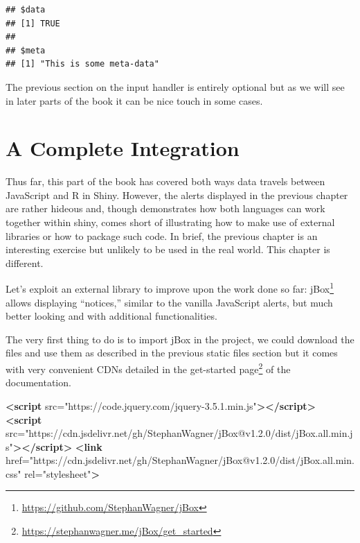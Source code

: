 \documentclass[
]{krantz}
\makeatletter
\newenvironment{Shaded}{\begin{snugshade}}{\end{snugshade}}
\newcommand{\KeywordTok}[1]{\textcolor[rgb]{0.27,0.27,0.27}{\textbf{#1}}}
\newcommand{\OtherTok}[1]{\textcolor[rgb]{0.37,0.37,0.37}{#1}}
\newcommand{\StringTok}[1]{\textcolor[rgb]{0.5,0.5,0.5}{#1}}
\renewcommand{\href}[2]{#2\footnote{\url{#1}}}
\newenvironment{kframe}{%
\medskip{}
\setlength{\fboxsep}{.8em}
 \def\at@end@of@kframe{}%
 \ifinner\ifhmode%
  \def\at@end@of@kframe{\end{minipage}}%
  \begin{minipage}{\columnwidth}%
 \fi\fi%
 \def\FrameCommand##1{\hskip\@totalleftmargin \hskip-\fboxsep
 \colorbox{shadecolor}{##1}\hskip-\fboxsep
     \hskip-\linewidth \hskip-\@totalleftmargin \hskip\columnwidth}%
 \MakeFramed {\advance\hsize-\width
   \@totalleftmargin\z@ \linewidth\hsize
   \@setminipage}}%
 {\par\unskip\endMakeFramed%
 \at@end@of@kframe}
\renewenvironment{Shaded}{\begin{kframe}}{\end{kframe}}
\makeatother
\begin{document}
\begin{verbatim}
## $data
## [1] TRUE
## 
## $meta
## [1] "This is some meta-data"
\end{verbatim}

The previous section on the input handler is entirely optional but as we will see in later parts of the book it can be nice touch in some cases.

\hypertarget{a-complete-integration}{%
\chapter{A Complete Integration}\label{a-complete-integration}}

Thus far, this part of the book has covered both ways data travels between JavaScript and R in Shiny. However, the alerts displayed in the previous chapter are rather hideous and, though demonstrates how both languages can work together within shiny, comes short of illustrating how to make use of external libraries or how to package such code. In brief, the previous chapter is an interesting exercise but unlikely to be used in the real world. This chapter is different.

Let's exploit an external library to improve upon the work done so far: \href{https://github.com/StephanWagner/jBox}{jBox} allows displaying ``notices,'' similar to the vanilla JavaScript alerts, but much better looking and with additional functionalities.

The very first thing to do is to import jBox in the project, we could download the files and use them as described in the previous static files section but it comes with very convenient CDNs detailed in the \href{https://stephanwagner.me/jBox/get_started}{get-started page} of the documentation.

\begin{Shaded}
\begin{Highlighting}[]
\KeywordTok{\textless{}script}\OtherTok{ src=}\StringTok{"https://code.jquery.com/jquery{-}3.5.1.min.js"}\KeywordTok{\textgreater{}\textless{}/script\textgreater{}}
\KeywordTok{\textless{}script}\OtherTok{ src=}\StringTok{"https://cdn.jsdelivr.net/gh/StephanWagner/jBox@v1.2.0/dist/jBox.all.min.js"}\KeywordTok{\textgreater{}\textless{}/script\textgreater{}}
\KeywordTok{\textless{}link}\OtherTok{ href=}\StringTok{"https://cdn.jsdelivr.net/gh/StephanWagner/jBox@v1.2.0/dist/jBox.all.min.css"}\OtherTok{ rel=}\StringTok{"stylesheet"}\KeywordTok{\textgreater{}}
\end{Highlighting}
\end{Shaded}
\end{document}

